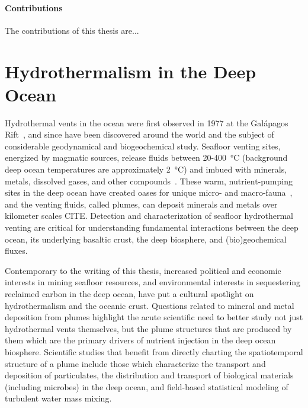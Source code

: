 \paragraph{Contributions}
The contributions of this thesis are...




\section{Hydrothermalism in the Deep Ocean}
\label{sec:charting-plumes}
Hydrothermal vents in the ocean were first observed in 1977 at the Galápagos Rift~\autocite{corliss1979submarine}, and since have been discovered around the world and the subject of considerable geodynamical and biogeochemical study.
Seafloor venting sites, energized by magmatic sources, release fluids between 20-\SI{400}{\celsius} (background deep ocean temperatures are approximately \SI{2}{\celsius}) and imbued with minerals, metals, dissolved gases, and other compounds~\autocite{jannasch1985geomicrobiology, martin2008hydrothermal}.
These warm, nutrient-pumping sites in the deep ocean have created oases for unique micro- and macro-fauna~\autocite{corliss1979submarine}, and the venting fluids, called plumes, can deposit minerals and metals over kilometer scales CITE.
Detection and characterization of seafloor hydrothermal venting are critical for  understanding fundamental interactions between the deep ocean, its underlying basaltic crust, the deep biosphere, and (bio)geochemical fluxes.

Contemporary to the writing of this thesis, increased political and economic interests in mining seafloor resources, and environmental interests in sequestering reclaimed carbon in the deep ocean, have put a cultural spotlight on hydrothermalism and the oceanic crust.
Questions related to mineral and metal deposition from plumes highlight the acute scientific need to better study not just hydrothermal vents themselves, but the plume structures that are produced by them which are the primary drivers of nutrient injection in the deep ocean biosphere.
Scientific studies that benefit from directly charting the spatiotemporal structure of a plume include those which characterize the transport and deposition of particulates, the distribution and transport of biological materials (including microbes) in the deep ocean, and field-based statistical modeling of turbulent water mass mixing.

